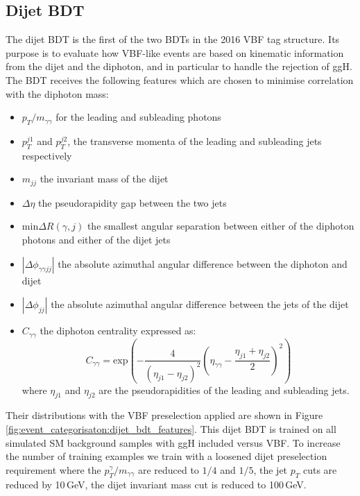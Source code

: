 \subsection{Dijet BDT}
The dijet BDT is the first of the two BDTs in the 2016 VBF tag structure. 
Its purpose is to evaluate how VBF-like events are based on kinematic information from the dijet and the diphoton, and in particular to handle the rejection of ggH.
The BDT receives the following features which are chosen to minimise correlation with the diphoton mass:
\begin{itemize}[leftmargin=.5in,noitemsep]
    \item $p_{T}/m_{\gamma\gamma}$ for the leading and subleading photons
    \item $p_{T}^{j1}$ and $p_{T}^{j2}$, the transverse momenta of the leading and subleading jets respectively
    \item $m_{jj}$ the invariant mass of the dijet
    \item $\Delta\eta$ the pseudorapidity gap between the two jets
    \item $\mathrm{min}\Delta{R}(\gamma,j)$ the smallest angular separation between either of the diphoton photons and either of the dijet jets
    \item $|\Delta\phi_{\gamma\gamma{jj}}|$ the absolute azimuthal angular difference between the diphoton and dijet
    \item $|\Delta\phi_{jj}|$ the absolute azimuthal angular difference between the jets of the dijet
    \item $C_{\gamma\gamma}$ the diphoton centrality expressed as:
        \begin{equation}
            C_{\gamma\gamma} = \mathrm{exp}\left(-\frac{4}{(\eta_{j1} - \eta_{j2})^{2}}\left( \eta_{\gamma\gamma} - \frac{\eta_{j1} + \eta_{j2}}{2} \right)^{2}\right)
        \end{equation}
        where $\eta_{j1}$ and $\eta_{j2}$ are the pseudorapidities of the leading and subleading jets.
\end{itemize}
Their distributions with the VBF preselection applied are shown in Figure \ref{fig:event_categorisaton:dijet_bdt_features}.
This dijet BDT is trained on all simulated SM background samples with ggH included versus VBF. To increase the number of training examples we train with a loosened dijet preselection requirement where the $p_{T}^{\gamma}/m_{\gamma\gamma}$ are reduced to $1/4$ and $1/5$, the jet $p_T$ cuts are reduced by 10\,GeV, the dijet invariant mass cut is reduced to 100\,GeV.
